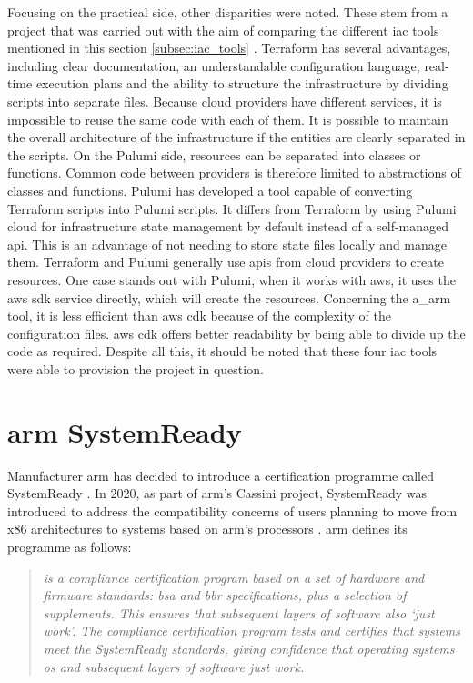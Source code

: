 Focusing on the practical side, other disparities were noted. These stem from a project that was carried out with the aim of comparing the different \acrshort{iac} tools mentioned in this section \ref{subsec:iac_tools} \cite{iac_tools}. Terraform has several advantages, including clear documentation, an understandable configuration language, real-time execution plans and the ability to structure the infrastructure by dividing scripts into separate files. Because \gls{cloud} providers have different services, it is impossible to reuse the same code with each of them. It is possible to maintain the overall architecture of the infrastructure if the entities are clearly separated in the scripts. On the Pulumi side, resources can be separated into classes or functions. Common code between providers is therefore limited to abstractions of classes and functions. Pulumi has developed a tool capable of converting Terraform scripts into Pulumi scripts. It differs from Terraform by using Pulumi \Gls{cloud} for infrastructure state management by default instead of a self-managed \acrshort{api}. This is an advantage of not needing to store state files locally and manage them. Terraform and Pulumi generally use \acrshort{api}s from \gls{cloud} providers to create resources. One case stands out with Pulumi, when it works with \gls{aws}, it uses the \gls{aws} \acrshort{sdk} service directly, which will create the resources. Concerning the \acrlong{a_arm} tool, it is less efficient than \gls{aws} \acrshort{cdk} because of the complexity of the configuration files. \gls{aws} \acrshort{cdk} offers better readability by being able to divide up the code as required. Despite all this, it should be noted that these four \acrshort{iac} tools were able to provision the project in question. \cite{iac_tools}


\section{\texorpdfstring{\gls{arm}}{} SystemReady}
\label{sec:arm_systemready}

Manufacturer \gls{arm} has decided to introduce a certification programme called SystemReady \cite{systemready_program}. In 2020, as part of \gls{arm}'s Cassini project, SystemReady was introduced to address the compatibility concerns of users planning to move from x86 architectures to systems based on \gls{arm}'s processors \cite{systemready_approval}. \gls{arm} defines its programme as follows:
\begin{quote}
    \textit{ is a compliance certification program based on a set of hardware and firmware standards: \acrfull{bsa} and \acrfull{bbr} specifications, plus a selection of supplements. This ensures that subsequent layers of software also ‘just work’. The compliance certification program tests and certifies that systems meet the SystemReady standards, giving confidence that operating systems \acrshort{os} and subsequent layers of software just work. \cite{systemready_program}}\\
\end{quote}

